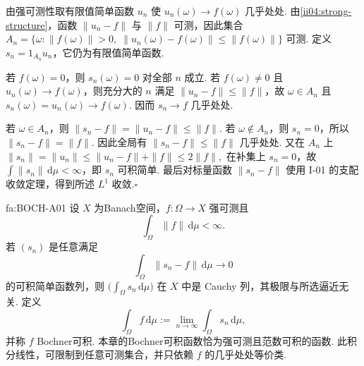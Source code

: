 \begin{FAProof}
由强可测性取有限值简单函数 \(\displaystyle u_n\) 使 \(\displaystyle u_n(\omega)\to f(\omega)\) 几乎处处. 由\autoref{ii04:strong-structure}，函数 \(\displaystyle\|u_n-f\|\) 与 \(\displaystyle\|f\|\) 可测，因此集合
\(\displaystyle A_n= \{\omega:\|f(\omega)\|>0,\;\|u_n(\omega)-f(\omega)\|\leqslant\|f(\omega)\|\}\)
可测. 定义 \(\displaystyle s_n=1_{A_n}u_n\)，它仍为有限值简单函数.

若 \(\displaystyle f(\omega)=0\)，则 \(\displaystyle s_n(\omega)=0\) 对全部 \(\displaystyle n\) 成立. 若 \(\displaystyle f(\omega)\neq0\) 且 \(\displaystyle u_n(\omega)\to f(\omega)\)，则充分大的 \(\displaystyle n\) 满足 \(\displaystyle\|u_n-f\|\leqslant\|f\|\)，故 \(\displaystyle\omega\in A_n\) 且 \(\displaystyle s_n(\omega)=u_n(\omega)\to f(\omega)\). 因而 \(\displaystyle s_n\to f\) 几乎处处.

若 \(\displaystyle\omega\in A_n\)，则 \(\displaystyle\|s_n-f\|=\|u_n-f\|\leqslant\|f\|\). 若 \(\displaystyle\omega\notin A_n\)，则 \(\displaystyle s_n=0\)，所以 \(\displaystyle\|s_n-f\|=\|f\|\). 因此全局有
\(\displaystyle \|s_n-f\|\leqslant\|f\|\)
几乎处处. 又在 \(\displaystyle A_n\) 上
\(\displaystyle \|s_n\|=\|u_n\|\leqslant\|u_n-f\|+\|f\|\leqslant2\|f\|,\)
在补集上 \(\displaystyle s_n=0\)，故 \(\displaystyle\int\|s_n\|\,\mathrm{d}\mu<\infty\)，即 \(\displaystyle s_n\) 可积简单. 最后对标量函数 \(\displaystyle\|s_n-f\|\) 使用 I-01 的支配收敛定理，得到所述 \(\displaystyle L^1\) 收敛.\hfill\(\square\)
\end{FAProof}

\begin{FATheorem}{fa:BOCH-A01}
设 \(\displaystyle X\) 为Banach空间，\(\displaystyle f:\Omega\to X\) 强可测且
\[
\int_\Omega\|f\|\,\mathrm{d}\mu<\infty.
\]
若 \(\displaystyle(s_n)\) 是任意满足
\[
\int_\Omega\|s_n-f\|\,\mathrm{d}\mu\longrightarrow0
\]
的可积简单函数列，则 \(\displaystyle\bigl(\int_\Omega s_n\,\mathrm{d}\mu\bigr)\) 在 \(\displaystyle X\) 中是 Cauchy 列，其极限与所选逼近无关. 定义
\[
\int_\Omega f\,\mathrm{d}\mu
:=
\lim_{n\to\infty}\int_\Omega s_n\,\mathrm{d}\mu,
\]
并称 \(\displaystyle f\) Bochner可积. 本章的Bochner可积函数恰为强可测且范数可积的函数. 此积分线性，可限制到任意可测集合，并只依赖 \(\displaystyle f\) 的几乎处处等价类.
\end{FATheorem}

